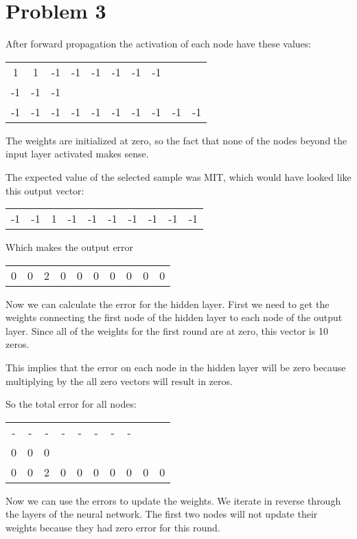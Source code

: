 \documentclass{article}
\begin{document}
\nbstop

\section*{Problem 3}
\nblock
After forward propagation the activation of each node have these values:

\begin{tabular}{c c c c c c c c c c}
1 & 1 & -1 & -1 & -1 & -1 & -1 & -1 & & \\
-1 & -1 & -1 & & & & & & & \\
-1 & -1 & -1 & -1 & -1 & -1 & -1 & -1 & -1 & -1
\end{tabular}

The weights are initialized at zero, so the fact that none of the nodes beyond 
the input layer activated makes sense.

The expected value of the selected sample was MIT, which would have 
looked like this output vector:

\begin{tabular}{c c c c c c c c c c}
-1 & -1 & 1 & -1 & -1 & -1 & -1 & -1 & -1 & -1
\end{tabular}

Which makes the output error

\begin{tabular}{c c c c c c c c c c}
0 & 0 & 2 & 0 & 0 & 0 & 0 & 0 & 0 & 0
\end{tabular}

Now we can calculate the error for the hidden layer.
First we need to get the weights connecting the first node
of the hidden layer to each node of the output layer.
Since all of the weights for the first round are at zero,
this vector is 10 zeros.

This implies that the error on each node in the hidden layer will 
be zero because multiplying by the all zero vectors will result in 
zeros.

So the total error for all nodes:

\begin{tabular}{c c c c c c c c c c}
- & - & - & - & - & - & - & - & & \\
0 & 0 & 0 & & & & & & & \\
0 & 0 & 2 & 0 & 0 & 0 & 0 & 0 & 0 & 0
\end{tabular}

Now we can use the errors to update the weights. We iterate in reverse through
the layers of the neural network. The first two nodes will not update their weights
because they had zero error for this round.
\end{document}
